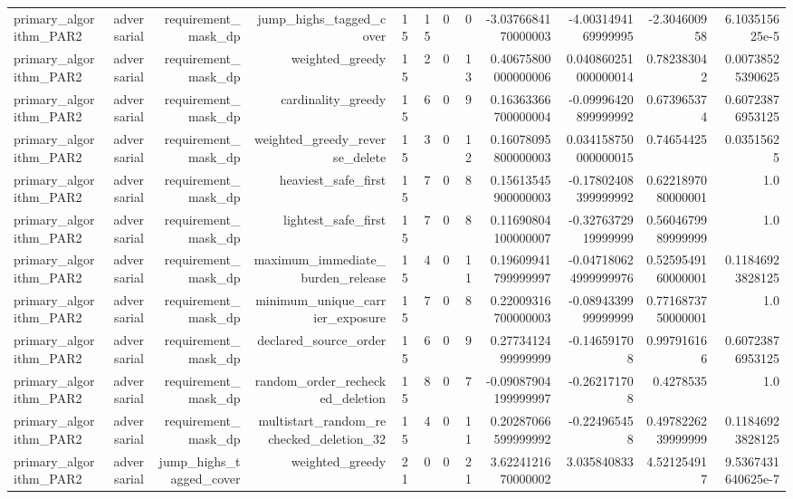 {\begin{longtable}{lrrrrrrrrrrr}
primary\_algorithm\_PAR2 & adversarial & requirement\_mask\_dp & jump\_highs\_tagged\_cover & 15 & 15 & 0 & 0 & -3.0376684170000003 & -4.0031494169999995 & -2.304600958 & 6.103515625e-5 \\
primary\_algorithm\_PAR2 & adversarial & requirement\_mask\_dp & weighted\_greedy & 15 & 2 & 0 & 13 & 0.40675800000000006 & 0.040860251000000014 & 0.782383042 & 0.00738525390625 \\
primary\_algorithm\_PAR2 & adversarial & requirement\_mask\_dp & cardinality\_greedy & 15 & 6 & 0 & 9 & 0.16363366700000004 & -0.09996420899999992 & 0.673965374 & 0.60723876953125 \\
primary\_algorithm\_PAR2 & adversarial & requirement\_mask\_dp & weighted\_greedy\_reverse\_delete & 15 & 3 & 0 & 12 & 0.16078095800000003 & 0.034158750000000015 & 0.74654425 & 0.03515625 \\
primary\_algorithm\_PAR2 & adversarial & requirement\_mask\_dp & heaviest\_safe\_first & 15 & 7 & 0 & 8 & 0.15613545900000003 & -0.17802408399999992 & 0.6221897080000001 & 1.0 \\
primary\_algorithm\_PAR2 & adversarial & requirement\_mask\_dp & lightest\_safe\_first & 15 & 7 & 0 & 8 & 0.11690804100000007 & -0.3276372919999999 & 0.5604679989999999 & 1.0 \\
primary\_algorithm\_PAR2 & adversarial & requirement\_mask\_dp & maximum\_immediate\_burden\_release & 15 & 4 & 0 & 11 & 0.19609941799999997 & -0.047180624999999976 & 0.5259549160000001 & 0.11846923828125 \\
primary\_algorithm\_PAR2 & adversarial & requirement\_mask\_dp & minimum\_unique\_carrier\_exposure & 15 & 7 & 0 & 8 & 0.22009316700000003 & -0.0894339999999999 & 0.7716873750000001 & 1.0 \\
primary\_algorithm\_PAR2 & adversarial & requirement\_mask\_dp & declared\_source\_order & 15 & 6 & 0 & 9 & 0.2773412499999999 & -0.146591708 & 0.997916166 & 0.60723876953125 \\
primary\_algorithm\_PAR2 & adversarial & requirement\_mask\_dp & random\_order\_rechecked\_deletion & 15 & 8 & 0 & 7 & -0.09087904199999997 & -0.262171708 & 0.4278535 & 1.0 \\
primary\_algorithm\_PAR2 & adversarial & requirement\_mask\_dp & multistart\_random\_rechecked\_deletion\_32 & 15 & 4 & 0 & 11 & 0.20287066599999992 & -0.224965458 & 0.4978226239999999 & 0.11846923828125 \\
primary\_algorithm\_PAR2 & adversarial & jump\_highs\_tagged\_cover & weighted\_greedy & 21 & 0 & 0 & 21 & 3.6224121670000002 & 3.035840833 & 4.521254917 & 9.5367431640625e-7 \\

\end{longtable}}
